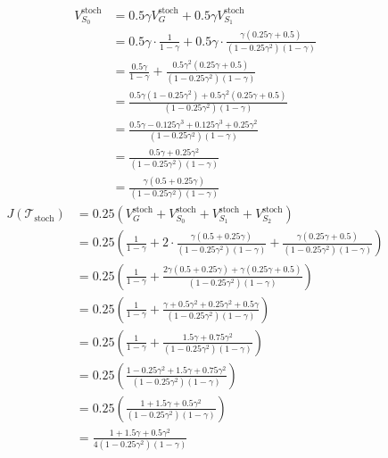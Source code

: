 \begin{align*}
    V^{\text{stoch}}_{S_0} &= 0.5\gamma V^{\text{stoch}}_G + 0.5\gamma V^{\text{stoch}}_{S_1} \\
    &= 0.5\gamma \cdot \frac{1}{1-\gamma} + 0.5\gamma \cdot \frac{\gamma(0.25\gamma + 0.5)}{(1 - 0.25\gamma^2)(1-\gamma)} \\
    &= \frac{0.5\gamma}{1-\gamma} + \frac{0.5\gamma^2(0.25\gamma + 0.5)}{(1 - 0.25\gamma^2)(1-\gamma)} \\
    &= \frac{0.5\gamma(1 - 0.25\gamma^2) + 0.5\gamma^2(0.25\gamma + 0.5)}{(1 - 0.25\gamma^2)(1-\gamma)} \\
    &= \frac{0.5\gamma - 0.125\gamma^3 + 0.125\gamma^3 + 0.25\gamma^2}{(1 - 0.25\gamma^2)(1-\gamma)} \\
    &= \frac{0.5\gamma + 0.25\gamma^2}{(1 - 0.25\gamma^2)(1-\gamma)} \\
    &= \frac{\gamma(0.5 + 0.25\gamma)}{(1 - 0.25\gamma^2)(1-\gamma)}
\end{align*}
\begin{align*}
    J(\mathcal{T}_{\text{stoch}}) &= 0.25(V^{\text{stoch}}_G + V^{\text{stoch}}_{S_0} + V^{\text{stoch}}_{S_1} + V^{\text{stoch}}_{S_2}) \\
    &= 0.25\left(\frac{1}{1-\gamma} + 2 \cdot \frac{\gamma(0.5 + 0.25\gamma)}{(1 - 0.25\gamma^2)(1-\gamma)} + \frac{\gamma(0.25\gamma + 0.5)}{(1 - 0.25\gamma^2)(1-\gamma)}\right) \\
    &= 0.25\left(\frac{1}{1-\gamma} + \frac{2\gamma(0.5 + 0.25\gamma) + \gamma(0.25\gamma + 0.5)}{(1 - 0.25\gamma^2)(1-\gamma)}\right) \\
    &= 0.25\left(\frac{1}{1-\gamma} + \frac{\gamma + 0.5\gamma^2 + 0.25\gamma^2 + 0.5\gamma}{(1 - 0.25\gamma^2)(1-\gamma)}\right) \\
    &= 0.25\left(\frac{1}{1-\gamma} + \frac{1.5\gamma + 0.75\gamma^2}{(1 - 0.25\gamma^2)(1-\gamma)}\right) \\
    &= 0.25\left(\frac{1 - 0.25\gamma^2 + 1.5\gamma + 0.75\gamma^2}{(1 - 0.25\gamma^2)(1-\gamma)}\right) \\
    &= 0.25\left(\frac{1 + 1.5\gamma + 0.5\gamma^2}{(1 - 0.25\gamma^2)(1-\gamma)}\right) \\
    &= \frac{1 + 1.5\gamma + 0.5\gamma^2}{4(1 - 0.25\gamma^2)(1-\gamma)}
\end{align*}

